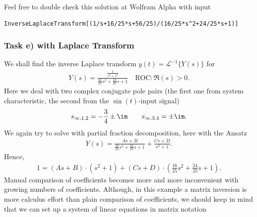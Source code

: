 Feel free to double check this solution at Wolfram Alpha with input
\begin{verbatim}
InverseLaplaceTransform[(1/s+16/25*s+56/25)/(16/25*s^2+24/25*s+1)]
\end{verbatim}


\subsubsection{Task e) with Laplace Transform}
We shall find the inverse Laplace transform $y(t) = \mathcal{L}^{-1}\{Y(s)\}$
for
\begin{align}
Y(s) = \frac{\frac{1}{s^2 + 1^2}}{\frac{16}{25} s^2 + \frac{24}{25} s + 1}
\quad \text{ROC}: \Re(s) > 0.
\end{align}
Here we deal with two complex conjugate pole pairs (the first one from system
characteristic, the second from the $\sin(t)$-input signal)
\begin{align}
s_{\infty,1,2} = -\frac{3}{4} \pm \im \qquad s_{\infty,3,4} = \pm \im.
\end{align}
We again try to solve with partial fraction decomposition, here with the Ansatz
\begin{align}
Y(s) = \frac{A s + B}{\frac{16}{25} s^2 + \frac{24}{25} s + 1}+
\frac{C s + D}{s^2+1}.
\end{align}
Hence,
\begin{align}
1=
(A s + B) \cdot (s^2+1)+
(C s + D) \cdot (\frac{16}{25} s^2 + \frac{24}{25} s + 1).
\end{align}
Manual comparison of coefficients becomes more and more inconvenient with growing
numbers of coefficients.
Although, in this example a matrix inversion is more calculus effort than plain
comparison of coefficients, we should keep in mind that we can set up a system
of linear equations in matrix notation

